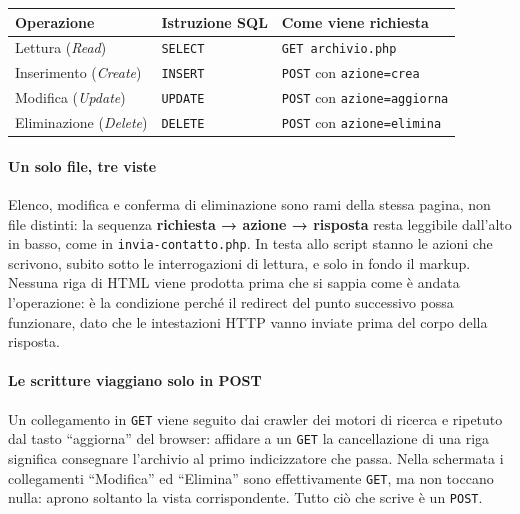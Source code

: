 \documentclass[
  11pt,
]{article}
\begin{document}
\begin{longtable}[]{@{}lll@{}}
\toprule\noalign{}
Operazione & Istruzione SQL & Come viene richiesta \\
\midrule\noalign{}
\endhead
\bottomrule\noalign{}
\endlastfoot
Lettura (\emph{Read}) & \texttt{SELECT} & \texttt{GET\ archivio.php} \\
Inserimento (\emph{Create}) & \texttt{INSERT} & \texttt{POST} con
\texttt{azione=crea} \\
Modifica (\emph{Update}) & \texttt{UPDATE} & \texttt{POST} con
\texttt{azione=aggiorna} \\
Eliminazione (\emph{Delete}) & \texttt{DELETE} & \texttt{POST} con
\texttt{azione=elimina} \\
\end{longtable}

\hypertarget{un-solo-file-tre-viste}{%
\paragraph{Un solo file, tre viste}\label{un-solo-file-tre-viste}}

Elenco, modifica e conferma di eliminazione sono rami della stessa
pagina, non file distinti: la sequenza \textbf{richiesta → azione →
risposta} resta leggibile dall'alto in basso, come in
\texttt{invia-contatto.php}. In testa allo script stanno le azioni che
scrivono, subito sotto le interrogazioni di lettura, e solo in fondo il
markup. Nessuna riga di HTML viene prodotta prima che si sappia come è
andata l'operazione: è la condizione perché il redirect del punto
successivo possa funzionare, dato che le intestazioni HTTP vanno inviate
prima del corpo della risposta.

\hypertarget{le-scritture-viaggiano-solo-in-post}{%
\paragraph{Le scritture viaggiano solo in
POST}\label{le-scritture-viaggiano-solo-in-post}}

Un collegamento in \texttt{GET} viene seguito dai crawler dei motori di
ricerca e ripetuto dal tasto ``aggiorna'' del browser: affidare a un
\texttt{GET} la cancellazione di una riga significa consegnare
l'archivio al primo indicizzatore che passa. Nella schermata i
collegamenti ``Modifica'' ed ``Elimina'' sono effettivamente
\texttt{GET}, ma non toccano nulla: aprono soltanto la vista
corrispondente. Tutto ciò che scrive è un \texttt{POST}.
\end{document}
